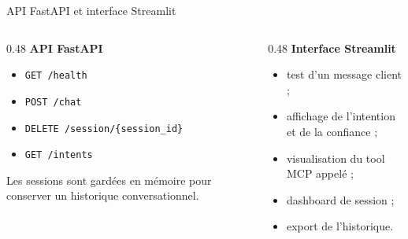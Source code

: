 \documentclass[aspectratio=169,10pt]{beamer}
\begin{document}
\begin{frame}{API FastAPI et interface Streamlit}
    \begin{columns}[T]
        \begin{column}{0.48\textwidth}
            \textbf{API FastAPI}
            \begin{itemize}
                \item \texttt{GET /health}
                \item \texttt{POST /chat}
                \item \texttt{DELETE /session/\{session\_id\}}
                \item \texttt{GET /intents}
            \end{itemize}

            \vspace{0.2cm}
            Les sessions sont gardées en mémoire pour conserver un historique conversationnel.
        \end{column}
        \begin{column}{0.48\textwidth}
            \textbf{Interface Streamlit}
            \begin{itemize}
                \item test d'un message client ;
                \item affichage de l'intention et de la confiance ;
                \item visualisation du tool MCP appelé ;
                \item dashboard de session ;
                \item export de l'historique.
            \end{itemize}
        \end{column}
    \end{columns}
\end{frame}
\end{document}
